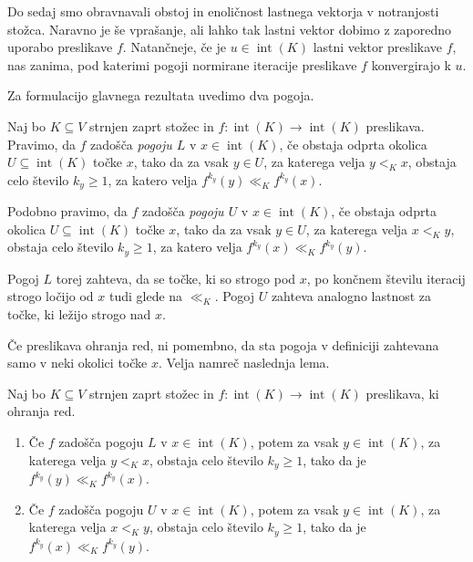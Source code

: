 \documentclass[mat2, tisk]{fmfdelo}
\begin{document}
Do sedaj smo obravnavali obstoj in enoličnost lastnega vektorja v
notranjosti stožca. Naravno je še vprašanje, ali lahko tak lastni
vektor dobimo z zaporedno uporabo preslikave $f$. Natančneje,
če je $u\in\operatorname{int}(K)$ lastni vektor preslikave $f$, nas
zanima, pod katerimi pogoji normirane iteracije preslikave $f$
konvergirajo k $u$.

Za formulacijo glavnega rezultata uvedimo dva pogoja.

\begin{definicija}\label{def:pogoja_L_U}
  Naj bo $K\subseteq V$ strnjen zaprt stožec in
  $f:\operatorname{int}(K)\longrightarrow\operatorname{int}(K)$
  preslikava. Pravimo, da $f$ zadošča \emph{pogoju $L$} v
  $x\in\operatorname{int}(K)$, če obstaja odprta okolica
  $U\subseteq\operatorname{int}(K)$ točke $x$, tako da za vsak
  $y\in U$, za katerega velja $y<_Kx$, obstaja celo število
  $k_y\geq1$, za katero velja
  $f^{k_y}(y)\ll_K f^{k_y}(x)$.

  Podobno pravimo, da $f$ zadošča \emph{pogoju $U$} v
  $x\in\operatorname{int}(K)$, če obstaja odprta okolica
  $U\subseteq\operatorname{int}(K)$ točke $x$, tako da za vsak
  $y\in U$, za katerega velja $x<_Ky$, obstaja celo število
  $k_y\geq1$, za katero velja
  $f^{k_y}(x)\ll_K f^{k_y}(y)$.
\end{definicija}

Pogoj $L$ torej zahteva, da se točke, ki so strogo pod $x$, po
končnem številu iteracij strogo ločijo od $x$ tudi glede na
$\ll_K$. Pogoj $U$ zahteva analogno lastnost za točke, ki ležijo
strogo nad $x$.

Če preslikava ohranja red, ni pomembno, da sta pogoja v definiciji
zahtevana samo v neki okolici točke $x$. Velja namreč naslednja
lema.

\begin{lema}\label{lema:pogoja_L_U_globalno}
  Naj bo $K\subseteq V$ strnjen zaprt stožec in
  $f:\operatorname{int}(K)\longrightarrow\operatorname{int}(K)$
  preslikava, ki ohranja red.
  \begin{enumerate}[label=(\roman*)]
    \item Če $f$ zadošča pogoju $L$ v $x\in\operatorname{int}(K)$, potem za
          vsak $y\in\operatorname{int}(K)$, za katerega velja $y<_Kx$,
          obstaja celo število $k_y\geq1$, tako da je
          $f^{k_y}(y)\ll_Kf^{k_y}(x)$.
    \item Če $f$ zadošča pogoju $U$ v $x\in\operatorname{int}(K)$, potem za
          vsak $y\in\operatorname{int}(K)$, za katerega velja $x<_Ky$, obstaja celo število $k_y\geq1$, tako da je
          $f^{k_y}(x)\ll_Kf^{k_y}(y)$.
  \end{enumerate}
\end{lema}
\end{document}
